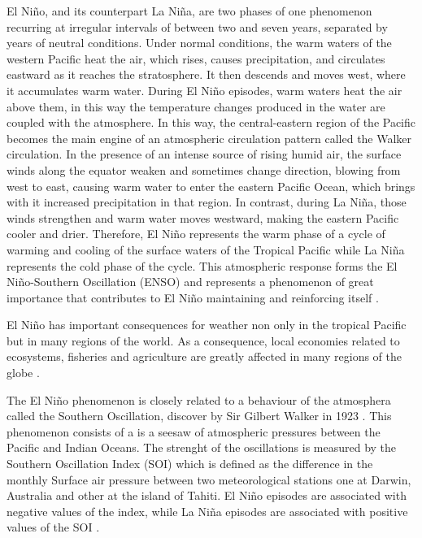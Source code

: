 \documentclass[onecolumn, preprint,aps,amsmath, amssymb, superscriptaddress]{revtex4}
\begin{document}
El Niño, and its counterpart La Niña, are two phases of one phenomenon recurring at irregular intervals of between two and seven years, separated by years of neutral conditions.
Under normal conditions, the warm waters of the western Pacific heat the air, which rises, causes precipitation, and circulates eastward as it reaches the stratosphere. It then descends and moves west, where it accumulates warm water.
During El Niño episodes, warm waters heat the air above them, in this way the temperature changes produced in the water are coupled with the atmosphere. In this way, the central-eastern region of the Pacific becomes the main engine of an atmospheric circulation pattern called the Walker circulation.
In the presence of an intense source of rising humid air, the surface winds along the equator weaken and sometimes change direction, blowing from west to east, causing warm water to enter the eastern Pacific Ocean, which brings with it increased precipitation in that region.
In contrast, during La Niña, those winds strengthen and warm water moves westward, making the eastern Pacific cooler and drier. Therefore, El Niño represents the warm phase of a cycle of warming and cooling of the surface waters of the Tropical Pacific while La Niña represents the cold phase of the cycle.
This atmospheric response forms the El Niño-Southern Oscillation (ENSO) and represents a phenomenon of great importance that contributes to El Niño maintaining and reinforcing itself \cite{Philander}.

El Niño has important consequences for weather non only in the tropical Pacific but in many regions of the world. As a consequence, local economies related to ecosystems, fisheries and agriculture are greatly affected in many regions of the globe \cite{Glantz}.

The El Niño phenomenon is closely related to a behaviour of the atmosphera called the Southern Oscillation, discover by Sir Gilbert Walker in 1923 \cite{Walker}. This phenomenon consists of a is a seesaw of atmospheric pressures between the Pacific and Indian Oceans. The strenght of the oscillations is measured by the Southern Oscillation Index (SOI) which is defined as the difference in the monthly Surface air pressure between two meteorological stations one at Darwin, Australia and other at the island of Tahiti. El Ni\~no episodes are associated with negative values of the index, while La Ni\~na episodes are associated with positive values of the SOI \cite{Sarachik}.
\end{document}
